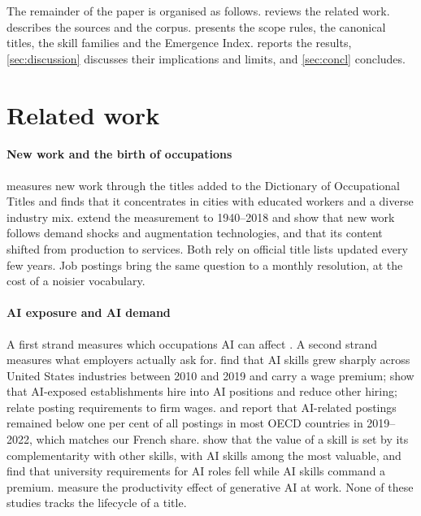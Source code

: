\documentclass[3p,times,10pt,authoryear]{elsarticle}
\begin{document}
The remainder of the paper is organised as follows.  reviews the related work.  describes the sources and the corpus.  presents the scope rules, the canonical titles, the skill families and the Emergence Index.  reports the results, \cref{sec:discussion} discusses their implications and limits, and \cref{sec:concl} concludes.

\section{Related work}\label{sec:lit}
\paragraph{New work and the birth of occupations} \citet{lin2011} measures new work through the titles added to the Dictionary of Occupational Titles and finds that it concentrates in cities with educated workers and a diverse industry mix. \citet{autor2024} extend the measurement to 1940--2018 and show that new work follows demand shocks and augmentation technologies, and that its content shifted from production to services. Both rely on official title lists updated every few years. Job postings bring the same question to a monthly resolution, at the cost of a noisier vocabulary.

\paragraph{AI exposure and AI demand} A first strand measures which occupations AI can affect \citep{frey2017,felten2021,eloundou2024,gmyrek2023}. A second strand measures what employers actually ask for. \citet{alekseeva2021} find that AI skills grew sharply across United States industries between 2010 and 2019 and carry a wage premium; \citet{acemoglu2022} show that AI-exposed establishments hire into AI positions and reduce other hiring; \citet{deming2018} relate posting requirements to firm wages. \citet{squicciarini2021} and \citet{borgonovi2023} report that AI-related postings remained below one per cent of all postings in most OECD countries in 2019--2022, which matches our French share. \citet{stephany2024} show that the value of a skill is set by its complementarity with other skills, with AI skills among the most valuable, and \citet{bone2025} find that university requirements for AI roles fell while AI skills command a premium. \citet{brynjolfsson2025} measure the productivity effect of generative AI at work. None of these studies tracks the lifecycle of a title.
\end{document}
